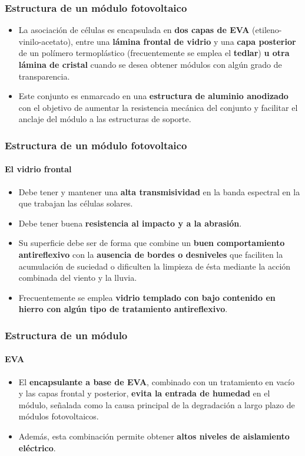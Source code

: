 \documentclass[xcolor=dvipsnames]{beamer}
\begin{document}
\begin{frame}
  \frametitle{Estructura de un módulo fotovoltaico}
  \begin{itemize}
  \item La asociación de células es encapsulada en \textbf{dos capas
      de EVA }(etileno-vinilo-acetato), entre una \textbf{lámina
      frontal de vidrio} y una \textbf{capa posterior} de un polímero
    termoplástico (frecuentemente se emplea el \textbf{tedlar})
    \textbf{u otra lámina de cristal }cuando se desea obtener módulos
    con algún grado de transparencia.
  \item Este conjunto es enmarcado en una \textbf{estructura de
      aluminio anodizado} con el objetivo de aumentar la resistencia
    mecánica del conjunto y facilitar el anclaje del módulo a las
    estructuras de soporte.
  \end{itemize}

\end{frame}

\begin{frame}
  \frametitle{Estructura de un módulo fotovoltaico}


  \framesubtitle{El vidrio frontal }
  \begin{itemize}
  \item Debe tener y mantener una \textbf{alta transmisividad} en la
    banda espectral en la que trabajan las células solares.
  \item Debe tener buena \textbf{resistencia al impacto y a la
      abrasión}.
  \item Su superficie debe ser de forma que combine un \textbf{buen
      comportamiento antireflexivo} con la \textbf{ausencia de bordes
      o desniveles} que faciliten la acumulación de suciedad o
    dificulten la limpieza de ésta mediante la acción combinada del
    viento y la lluvia.
  \item Frecuentemente se emplea \textbf{vidrio templado con bajo
      contenido en hierro con algún tipo de tratamiento
      antireflexivo}.
  \end{itemize}

\end{frame}

\begin{frame}
  \frametitle{Estructura de un módulo}


  \framesubtitle{EVA}
  \begin{itemize}
  \item El \textbf{encapsulante a base de EVA}, combinado con un
    tratamiento en vacío y las capas frontal y posterior,
    \textbf{evita la entrada de humedad} en el módulo, señalada como
    la causa principal de la degradación a largo plazo de módulos
    fotovoltaicos.
  \item Además, esta combinación permite obtener \textbf{altos niveles
      de aislamiento eléctrico}.
  \end{itemize}

\end{frame}
\end{document}
